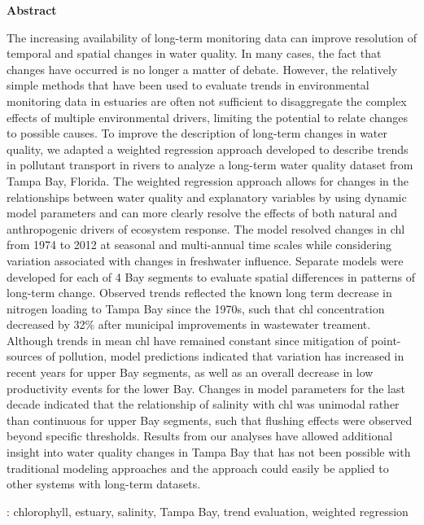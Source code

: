 \documentclass[letterpaper,12pt,oneside]{article}\usepackage{graphicx, color}
\begin{document}
\centerline{{\bf Abstract}}
\begin{singlespace} \small
\noindent The increasing availability of long-term monitoring data can improve resolution of temporal and spatial changes in water quality.  In many cases, the fact that changes have occurred is no longer a matter of debate.  However, the relatively simple methods that have been used to evaluate trends in environmental monitoring data in estuaries are often not sufficient to disaggregate the complex effects of multiple environmental drivers, limiting the potential to relate changes to possible causes.  To improve the description of long-term changes in water quality, we adapted a weighted regression approach developed to describe trends in pollutant transport in rivers to analyze a long-term water quality dataset from Tampa Bay, Florida.  The weighted regression approach allows for changes in the relationships between water quality and explanatory variables by using dynamic model parameters and can more clearly resolve the effects of both natural and anthropogenic drivers of ecosystem response.  The model resolved changes in \ac{chl} from 1974 to 2012 at seasonal and multi-annual time scales while considering variation associated with changes in freshwater influence.  Separate models were developed for each of 4 Bay segments to evaluate spatial differences in patterns of long-term change.  Observed trends reflected the known long term decrease in nitrogen loading to Tampa Bay since the 1970s, such that \ac{chl} concentration decreased by 32\% after municipal improvements in wastewater treament. Although trends in mean \ac{chl} have remained constant since mitigation of point-sources of pollution, model predictions indicated that variation has increased in recent years for upper Bay segments, as well as an overall decrease in low productivity events for the lower Bay. Changes in model parameters for the last decade indicated that the relationship of salinity with \ac{chl} was unimodal rather than continuous for upper Bay segments, such that flushing effects were observed beyond specific thresholds.  Results from our analyses have allowed additional insight into water quality changes in Tampa Bay that has not been possible with traditional modeling approaches and the approach could easily be applied to other systems with long-term datasets. \normalsize
\end{singlespace}
: chlorophyll, estuary, salinity, Tampa Bay, trend evaluation, weighted regression

\acresetall
\clearpage
\end{document}
